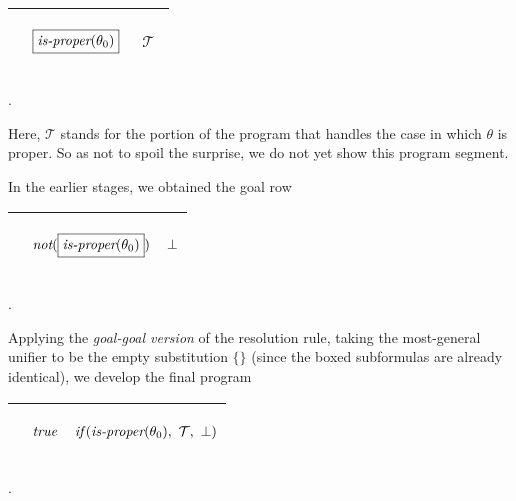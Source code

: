 \documentclass[runningheads]{llncs}
\DeclareMathOperator{\unot}{\emph{not}\kern-.0pt}
\begin{document}
\begin{center}
\begin{tabular}{|m{}|m{}||m{}|}
 \hline 
  & 
  \begin{center}
  \begin{align*}
\boxed{\emph{is-proper}(\theta_{0})}
  \end{align*}
\end{center} & \begin{center}
\begin{align*}\mathcal{T} 
\end{align*}
\end{center} \\
\hline
\end{tabular}.
\end{center}

\noindent
Here, $\mathcal{T}$ stands for the portion of the program that handles the case in which $\theta$ is proper.  So as not to spoil the surprise, we do not yet show this program segment.

In the earlier stages, we obtained the goal row 

\begin{center}
\begin{tabular}{|m{}|m{}||m{}|}
 \hline 
  &  \begin{center}
\begin{align*}
\unot(\boxed{\isprop(\thet{0})})
\end{align*}
\end{center} 
    & \begin{center}
    \begin{align*}
    \bot 
    \end{align*}\end{center} \\
\hline
\end{tabular}.
\end{center}
Applying the \emph{goal-goal version} of the resolution rule, taking the most-general unifier to be the empty substitution $\{\}$ (since the boxed subformulas are already identical), we develop the final program

\noindent
\begin{center}
\begin{tabular} {|m{}|m{}||m{}|}
\hline
     & 
     \begin{center}
\begin{align*}
\emph{true}
\end{align*}
\end{center} 
& 
\hspace{-2cm} \[\begin{aligned}
\emph{if}\,( {\emph{is-proper}(\theta_{0})},\allowbreak \ {\mathcal{T}},\allowbreak \ {\bot})
 \end{aligned}\] \hspace{2cm}
\\
  \hline
\end{tabular}.
\end{center}
\end{document}
